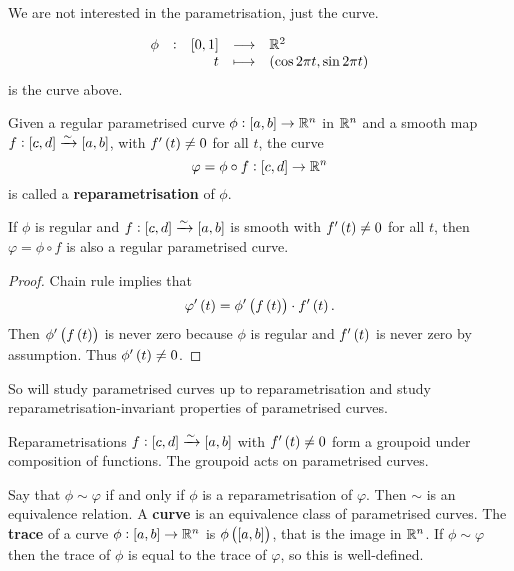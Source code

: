 We are not interested in the parametrisation, just the curve.

\begin{example*}
$$ \function[\phi]{\sbr{0, 1}}{\RR^2}{t}{\br{\cos 2\pi t, \sin 2\pi t}} $$
is the curve above.
\end{example*}

\pagebreak

\begin{definition}
Given a regular parametrised curve $ \phi : \sbr{a, b} \to \RR^n $ in $ \mathbb{R}^n $ and a smooth map $ f : \sbr{c, d} \xrightarrow{\sim} \sbr{a, b} $, with $ f'\br{t} \ne 0 $ for all $ t $, the curve
$$ \varphi = \phi \circ f : \sbr{c, d} \to \RR^n $$
is called a \textbf{reparametrisation} of $ \phi $.
\end{definition}

\begin{proposition}
If $ \phi $ is regular and $ f : \sbr{c, d} \xrightarrow{\sim} \sbr{a, b} $ is smooth with $ f'\br{t} \ne 0 $ for all $ t $, then $ \varphi = \phi \circ f $ is also a regular parametrised curve.
\end{proposition}

\begin{proof}
Chain rule implies that
$$ \varphi'\br{t} = \phi'\br{f\br{t}} \cdot f'\br{t}. $$
Then $ \phi'\br{f\br{t}} $ is never zero because $ \phi $ is regular and $ f'\br{t} $ is never zero by assumption. Thus $ \phi'\br{t} \ne 0 $.
\end{proof}

So will study parametrised curves up to reparametrisation and study reparametrisation-invariant properties of parametrised curves.

\begin{remark*}
Reparametrisations $ f : \sbr{c, d} \xrightarrow{\sim} \sbr{a, b} $ with $ f'\br{t} \ne 0 $ form a groupoid under composition of functions. The groupoid acts on parametrised curves.
\end{remark*}


Say that $ \phi \sim \varphi $ if and only if $ \phi $ is a reparametrisation of $ \varphi $. Then $ \sim $ is an equivalence relation. A \textbf{curve} is an equivalence class of parametrised curves. The \textbf{trace} of a curve $ \phi : \sbr{a, b} \to \RR^n $ is $ \phi\br{\sbr{a, b}} $, that is the image in $ \mathbb{R}^n $. If $ \phi \sim \varphi $ then the trace of $ \phi $ is equal to the trace of $ \varphi $, so this is well-defined.

